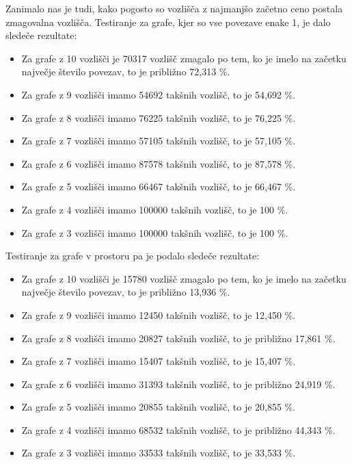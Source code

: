 \documentclass[fin1, tisk]{fmfdelo}
\begin{document}
Zanimalo nas je tudi, kako pogosto so vozlišča z najmanjšo začetno ceno postala zmagovalna vozlišča. Testiranje za grafe, kjer so vse povezave enake 1, je dalo sledeče rezultate:

\begin{itemize}
    \item Za grafe z 10 vozlišči je 70317 vozlišč zmagalo po tem, ko je imelo na začetku največje število povezav, to je približno 72,313 \%.
    \item Za grafe z 9 vozlišči imamo 54692 takšnih vozlišč, to je 54,692 \%.
    \item Za grafe z 8 vozlišči imamo 76225 takšnih vozlišč, to je 76,225 \%.
    \item Za grafe z 7 vozlišči imamo 57105 takšnih vozlišč, to je 57,105 \%.
    \item Za grafe z 6 vozlišči imamo 87578 takšnih vozlišč, to je 87,578 \%.
    \item Za grafe z 5 vozlišči imamo 66467 takšnih vozlišč, to je 66,467 \%.
    \item Za grafe z 4 vozlišči imamo 100000 takšnih vozlišč, to je 100 \%.
    \item Za grafe z 3 vozlišči imamo 100000 takšnih vozlišč, to je 100 \%.
\end{itemize}

Testiranje za grafe v prostoru pa je podalo sledeče rezultate:

\begin{itemize}
    \item Za grafe z 10 vozlišči je 15780 vozlišč zmagalo po tem, ko je imelo na začetku največje število povezav, to je približno 13,936 \%.
    \item Za grafe z 9 vozlišči imamo 12450 takšnih vozlišč, to je 12,450 \%.
    \item Za grafe z 8 vozlišči imamo 20827 takšnih vozlišč, to je približno 17,861 \%.
    \item Za grafe z 7 vozlišči imamo 15407 takšnih vozlišč, to je 15,407 \%.
    \item Za grafe z 6 vozlišči imamo 31393 takšnih vozlišč, to je približno 24,919 \%.
    \item Za grafe z 5 vozlišči imamo 20855 takšnih vozlišč, to je 20,855 \%.
    \item Za grafe z 4 vozlišči imamo 68532 takšnih vozlišč, to je približno 44,343 \%.
    \item Za grafe z 3 vozlišči imamo 33533 takšnih vozlišč, to je 33,533 \%.
\end{itemize}
\end{document}

